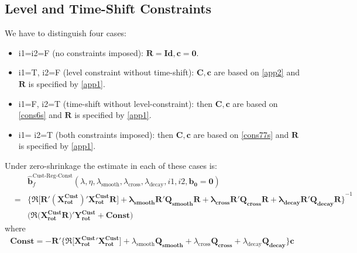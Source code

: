 \documentclass[11pt]{article}
\begin{document}
\subsection{Level and Time-Shift Constraints}

We have to distinguish four cases: 
\begin{itemize}
\item i1=i2=F (no constraints imposed): $\mathbf{R=Id,c=0}$.
\item i1=T, i2=F (level constraint without time-shift): $\mathbf{C,c}$ are based on \ref{app2} and $\mathbf{R}$ is specified by \ref{app1}. 
\item  i1=F, i2=T (time-shift without level-constraint): then $\mathbf{C,c}$ are based on \ref{cons6s} and $\mathbf{R}$ is specified by \ref{app1}. 
\item  i1= i2=T (both constraints imposed): then $\mathbf{C,c}$ are based on \ref{cons77s} and $\mathbf{R}$ is specified by \ref{app1}. 
\end{itemize}
Under zero-shrinkage the estimate in each of these cases is:
\begin{eqnarray*}
&&\mathbf{\hat{b}}^{\textrm{Cust-Reg-Const}}_f(\lambda,\eta,\lambda_{\textrm{smooth}},\lambda_{\textrm{cross}},\lambda_{\textrm{decay}},i1,i2,\mathbf{b_0=0})\nonumber\\
&=&\mathbf{\Big\{\Re\Big[R'(X_{\textrm{rot}}^{\textrm{Cust} })' X_{\textrm{rot}}^{\textrm{Cust}}R\Big]+
\lambda_{\textrm{smooth}}\mathbf{R'Q_{smooth}}R+\lambda_{\textrm{cross}}\mathbf{R'Q_{cross}R}+\lambda_{\textrm{decay}}\mathbf{R'Q_{decay}R}
\Big\}}^{-1}\nonumber\\
&&\Big(\Re(\mathbf{X_{\textrm{rot}}^{\textrm{Cust}}R)}'
\mathbf{Y_{\textrm{rot}}^{\textrm{Cust}}}+\mathbf{Const}\Big)
\end{eqnarray*}
where 
\begin{eqnarray*}\mathbf{Const}=-\mathbf{R}'\Big\{\Re\Big[\mathbf{X_{\textrm{rot}}^{\textrm{Cust}}}'\mathbf{X_{\textrm{rot}}^{\textrm{Cust}}}\Big]+
\lambda_{\textrm{smooth}}\mathbf{Q_{\textrm{smooth}}}+\lambda_{\textrm{cross}}\mathbf{Q_{\textrm{cross}}}+
\lambda_{\textrm{decay}}\mathbf{Q_{\textrm{decay}}}\Big\}\mathbf{c}
\end{eqnarray*}
\end{document}
